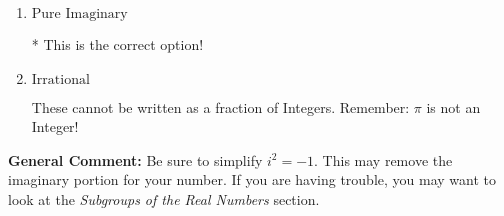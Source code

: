 \documentclass{extbook}[14pt]
\begin{document}
\begin{enumerate}
{\begin{enumerate}[label=\Alph*.]
This is not a number. The only non-Complex number we know is dividing by 0 as this is not a number!
\item \( \text{Pure Imaginary} \)

* This is the correct option!
\item \( \text{Irrational} \)

These cannot be written as a fraction of Integers. Remember: $\pi$ is not an Integer!
\end{enumerate}

\textbf{General Comment:} Be sure to simplify $i^2 = -1$. This may remove the imaginary portion for your number. If you are having trouble, you may want to look at the \textit{Subgroups of the Real Numbers} section.
}
\end{enumerate}
\end{document}
